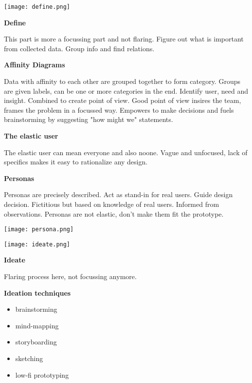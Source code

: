 \begin{center}
	\texttt{[image: define.png]}
\end{center}

\textbf{Define} \smallskip

This part is more a focussing part and not flaring. Figure out what is important from collected data. Group info and find relations. \medskip

\textbf{Affinity Diagrams} \smallskip

Data with affinity to each other are grouped together to form category. Groups are given labels, can be one or more categories in the end. 
Identify user, need and insight. Combined to create point of view. 
Good point of view insires the team, frames the problem in a focussed way. Empowers to make decisions and fuels brainstorming by suggesting "how might we" statements. \medskip

\textbf{The elastic user} \smallskip

The elastic user can mean everyone and also noone. Vague and unfocused, lack of specifics makes it easy to rationalize any design. \medskip

\textbf{Personas} \smallskip

Personas are precisely described. Act as stand-in for real users. Guide design decision. Fictitious but based on knowledge of real users. Informed from observations.
Personas are not elastic, don't make them fit the prototype. 

\begin{center}
	\texttt{[image: persona.png]}
\end{center}

\begin{center}
	\texttt{[image: ideate.png]}
\end{center}

\textbf{Ideate} \smallskip

Flaring process here, not focussing anymore. \medskip

\textbf{Ideation techniques}

\begin{multicols}{2}
    \begin{itemize}[itemsep=-5pt, topsep=-20pt, leftmargin=*]
	\item brainstorming
	\item mind-mapping
	\item storyboarding
	\item sketching
	\item low-fi prototyping
	\end{itemize}
\end{multicols}

\columnbreak
